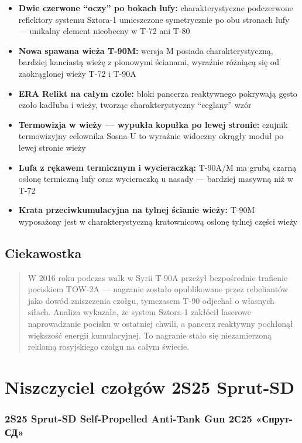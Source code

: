 \documentclass[12pt,oneside]{book}
\providecommand{\tightlist}{%
  \setlength{\itemsep}{0pt}\setlength{\parskip}{0pt}}
\begin{document}
\begin{itemize}
\tightlist
\item
  \textbf{Dwie czerwone ``oczy'' po bokach lufy:} charakterystyczne
  podczerwone reflektory systemu Sztora-1 umieszczone symetrycznie po
  obu stronach lufy --- unikalny element nieobecny w T-72 ani T-80
\item
  \textbf{Nowa spawana wieża T-90M:} wersja M posiada charakterystyczną,
  bardziej kanciastą wieżę z pionowymi ścianami, wyraźnie różniącą się
  od zaokrąglonej wieży T-72 i T-90A
\item
  \textbf{ERA Relikt na całym czole:} bloki pancerza reaktywnego
  pokrywają gęsto czoło kadłuba i wieży, tworząc charakterystyczny
  ``ceglany'' wzór
\item
  \textbf{Termowizja w wieży --- wypukła kopułka po lewej stronie:}
  czujnik termowizyjny celownika Sosna-U to wyraźnie widoczny okrągły
  moduł po lewej stronie wieży
\item
  \textbf{Lufa z rękawem termicznym i wycieraczką:} T-90A/M ma grubą
  czarną osłonę termiczną lufy oraz wycieraczką u nasady --- bardziej
  masywną niż w T-72
\item
  \textbf{Krata przeciwkumulacyjna na tylnej ścianie wieży:} T-90M
  wyposażony jest w charakterystyczną kratownicową osłonę tylnej części
  wieży
\end{itemize}

\subsection{Ciekawostka}\label{ciekawostka-5}

\begin{quote}
W 2016 roku podczas walk w Syrii T-90A przeżył bezpośrednie trafienie
pociskiem TOW-2A --- nagranie zostało opublikowane przez rebeliantów
jako dowód zniszczenia czołgu, tymczasem T-90 odjechał o własnych
siłach. Analiza wykazała, że system Sztora-1 zakłócił laserowe
naprowadzanie pocisku w ostatniej chwili, a pancerz reaktywny pochłonął
większość energii kumulacyjnej. To nagranie stało się niezamierzoną
reklamą rosyjskiego czołgu na całym świecie.
\end{quote}

\section{Niszczyciel czołgów 2S25
Sprut-SD}\label{niszczyciel-czoux142guxf3w-2s25-sprut-sd}

\subsubsection{2S25 Sprut-SD Self-Propelled Anti-Tank Gun \textbar{}
2С25
«Спрут-СД»}\label{s25-sprut-sd-self-propelled-anti-tank-gun-2ux44125-ux441ux43fux440ux443ux442-ux441ux434}
\end{document}
